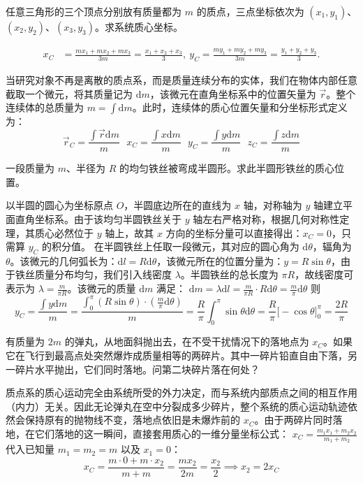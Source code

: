 \documentclass[lang=cn,11pt]{elegantbook}
\begin{document}
\begin{exercise}[任意三角形三个等质量点的质心]
任意三角形的三个顶点分别放有质量都为 \(m\) 的质点，三点坐标依次为 \((x_1,y_1)\)、\((x_2,y_2)\)、\((x_3,y_3)\)。求系统质心坐标。
\end{exercise}
\begin{solution}
\[
\begin{aligned}
x_C&=\frac{mx_1+mx_2+mx_3}{3m}
=\frac{x_1+x_2+x_3}{3},~y_C=\frac{my_1+my_2+my_3}{3m}
=\frac{y_1+y_2+y_3}{3}.
\end{aligned}
\]
\end{solution}

当研究对象不再是离散的质点系，而是质量连续分布的实体，我们在物体内部任意截取一个微元，将其质量记为 $\mathrm{d}m$，该微元在直角坐标系中的位置矢量为 $\vec{r}$。整个连续体的总质量为 $m = \int \mathrm{d}m$。此时，连续体的质心位置矢量和分坐标形式定义为：$$\vec{r}_C = \frac{\int \vec{r} \mathrm{d}m}{m}~~~x_C = \frac{\int x \mathrm{d}m}{m}~~~y_C = \frac{\int y \mathrm{d}m}{m}~~~ z_C = \frac{\int z \mathrm{d}m}{m}$$

\begin{example}
一段质量为 $m$、半径为 $R$ 的均匀铁丝被弯成半圆形。求此半圆形铁丝的质心位置。
\end{example}
\begin{solution}
以半圆的圆心为坐标原点 $O$，半圆底边所在的直线为 $x$ 轴，对称轴为 $y$ 轴建立平面直角坐标系。由于该均匀半圆铁丝关于 $y$ 轴左右严格对称，根据几何对称性定理，其质心必然位于 $y$ 轴上，故其 $x$ 方向的坐标分量可以直接得出：$x_C = 0$，只需算 $y_C$ 的积分值。
在半圆铁丝上任取一段微元，其对应的圆心角为 $\mathrm{d}\theta$，辐角为 $\theta$。该微元的几何弧长为：$\mathrm{d}l = R\mathrm{d}\theta$，该微元所在的位置分量为：$y = R\sin\theta$，由于铁丝质量分布均匀，我们引入线密度 $\lambda$。半圆铁丝的总长度为 $\pi R$，故线密度可表示为 $\lambda = \frac{m}{\pi R}$。该微元的质量 $\mathrm{d}m$ 满足： \(\mathrm{d}m = \lambda \mathrm{d}l = \frac{m}{\pi R} \cdot R\mathrm{d}\theta = \frac{m}{\pi}\mathrm{d}\theta\) 则
$$y_C = \frac{\int y \mathrm{d}m}{m} = \frac{\int_{0}^{\pi} (R\sin\theta) \cdot \left(\frac{m}{\pi}\mathrm{d}\theta\right)}{m}=\frac{R}{\pi} \int_{0}^{\pi} \sin\theta \mathrm{d}\theta = \frac{R}{\pi} \Big[ -\cos\theta \Big]_0^\pi = \frac{2R}{\pi}$$
\end{solution}

\begin{exercise}
有质量为 $2m$ 的弹丸，从地面斜抛出去，在不受干扰情况下的落地点为 $x_C$。如果它在飞行到最高点处突然爆炸成质量相等的两碎片。其中一碎片铅直自由下落，另一碎片水平抛出，它们同时落地。问第二块碎片落在何处？
\end{exercise}
\begin{solution}
质点系的质心运动完全由系统所受的外力决定，而与系统内部质点之间的相互作用（内力）无关。因此无论弹丸在空中分裂成多少碎片，整个系统的质心运动轨迹依然会保持原有的抛物线不变，落地点依旧是未爆炸前的 $x_C$。由于两碎片同时落地，在它们落地的这一瞬间，直接套用质心的一维分量坐标公式： \(x_C = \frac{m_1 x_1 + m_2 x_2}{m_1 + m_2}\) 代入已知量 $m_1 = m_2 = m$ 以及 $x_1 = 0$：$$x_C = \frac{m \cdot 0 + m \cdot x_2}{m + m} = \frac{m x_2}{2m} = \frac{x_2}{2}\implies x_2 = 2x_C$$
\end{solution}
\end{document}
